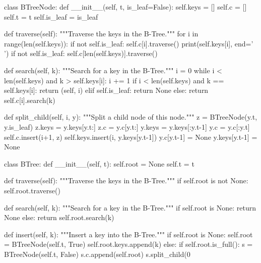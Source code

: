 class BTreeNode:
    def __init__(self, t, is_leaf=False):
        self.keys = []
        self.c = []
        self.t = t
        self.is_leaf = is_leaf

    def traverse(self):
        """Traverse the keys in the B-Tree."""
        for i in range(len(self.keys)):
            if not self.is_leaf:
                self.c[i].traverse()
            print(self.keys[i], end=' ')
        if not self.is_leaf:
            self.c[len(self.keys)].traverse()

    def search(self, k):
        """Search for a key in the B-Tree."""
        i = 0
        while i < len(self.keys) and k > self.keys[i]:
            i += 1
        if i < len(self.keys) and k == self.keys[i]:
            return (self, i)
        elif self.is_leaf:
            return None
        else:
            return self.c[i].search(k)

    def split_child(self, i, y):
        """Split a child node of this node."""
        z = BTreeNode(y.t, y.is_leaf)
        z.keys = y.keys[y.t:]
        z.c = y.c[y.t:]
        y.keys = y.keys[:y.t-1]
        y.c = y.c[:y.t]
        self.c.insert(i+1, z)
        self.keys.insert(i, y.keys[y.t-1])
        y.c[y.t-1] = None
        y.keys[y.t-1] = None

class BTree:
    def __init__(self, t):
        self.root = None
        self.t = t

    def traverse(self):
        """Traverse the keys in the B-Tree."""
        if self.root is not None:
            self.root.traverse()

    def search(self, k):
        """Search for a key in the B-Tree."""
        if self.root is None:
            return None
        else:
            return self.root.search(k)

    def insert(self, k):
        """Insert a key into the B-Tree."""
        if self.root is None:
            self.root = BTreeNode(self.t, True)
            self.root.keys.append(k)
        else:
            if self.root.is_full():
                s = BTreeNode(self.t, False)
                s.c.append(self.root)
                s.split_child(0
